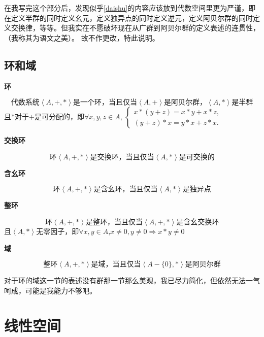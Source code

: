 \documentclass[12pt,hyperref,a4paper,UTF8]{ctexart}
\begin{document}
在我写完这个部分后，发现似乎\ref{daishu}的内容应该放到代数空间里更为严谨，即在定义半群的同时定义幺元，定义独异点的同时定义逆元，定义阿贝尔群的同时定义交换律，等等。但我实在不愿破坏现在从广群到阿贝尔群的定义表述的连贯性，（我称其为语文之美）。
故不作更改，特此说明。

\subsection{环和域}

\textbf{环}
\begin{Definition}
$$
\text{代数系统}\left< A,+,* \right> \text{是一个环，当且仅当}\left< A,+ \right> \text{是阿贝尔群，}\left< A,* \right> \text{是半群}
$$
且$*$对于$+$是可分配的，即$\forall x,y,z\in A$,
$\begin{cases}
    x*(y+z)=x*y+x*z, \\
    (y+z)*x=y*x+z*x.
\end{cases}
$
\end{Definition}

\textbf{交换环}
\begin{Definition}
$$
\text{环}\left< A,+,* \right> \text{是交换环，当且仅当}\left< A,* \right> \text{是可交换的}
$$
\end{Definition}

\textbf{含幺环}
\begin{Definition}
$$
\text{环}\left< A,+,* \right> \text{是含幺环，当且仅当}\left< A,* \right> \text{是独异点}
$$
\end{Definition}

\textbf{整环}
\begin{Definition}
$$
\text{环}\left< A,+,* \right> \text{是整环，当且仅当}\left< A,+,* \right> \text{是含幺交换环}
$$
且$\left< A,* \right>$无零因子，即$\forall x,y\in A$,$x\neq 0 , y\neq 0 \Rightarrow x*y\neq 0$

\end{Definition}

\textbf{域}
\begin{Definition}
$$
\text{整环}\left< A,+,* \right> \text{是域，当且仅当}\left< A-\{0\},* \right>\text{是阿贝尔群}
$$
\end{Definition}

对于环的域这一节的表述没有群那一节那么美观，我已尽力简化，但依然无法一气呵成，可能是我能力不够吧。

\section{线性空间}
\end{document}
